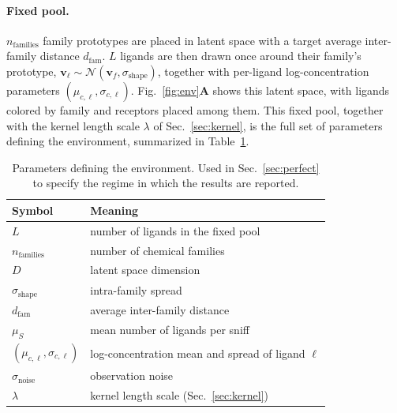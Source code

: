\documentclass[aps,pre,superscriptaddress,floatfix,longbibliography]{revtex4-2}
\begin{document}
\paragraph{Fixed pool.} $n_\text{families}$ family prototypes are placed in
latent space with a target average inter-family distance $d_\text{fam}$.
$L$ ligands are then drawn once around their family's prototype,
$\mathbf v_\ell \sim \mathcal N(\mathbf v_f,\sigma_\text{shape})$, together
with per-ligand log-concentration parameters $(\mu_{c,\ell},\sigma_{c,\ell})$.
Fig.~\ref{fig:env}\textbf{A} shows this latent space, with ligands colored by
family and receptors placed among them. This fixed pool, together with the
kernel length scale $\lambda$ of Sec.~\ref{sec:kernel}, is the full set of
parameters defining the environment, summarized in Table~\ref{tab:env_params}.

\begin{table}[t]
\centering
\begin{tabular}{ll}
Symbol & Meaning \\
\hline
$L$ & number of ligands in the fixed pool \\
$n_\text{families}$ & number of chemical families \\
$D$ & latent space dimension \\
$\sigma_\text{shape}$ & intra-family spread \\
$d_\text{fam}$ & average inter-family distance \\
$\mu_S$ & mean number of ligands per sniff \\
$(\mu_{c,\ell},\sigma_{c,\ell})$ & log-concentration mean and spread of ligand $\ell$ \\
$\sigma_\text{noise}$ & observation noise \\
$\lambda$ & kernel length scale (Sec.~\ref{sec:kernel}) \\
\end{tabular}
\caption{Parameters defining the environment. Used in Sec.~\ref{sec:perfect}
to specify the regime in which the results are reported.}
\label{tab:env_params}
\end{table}
\end{document}
